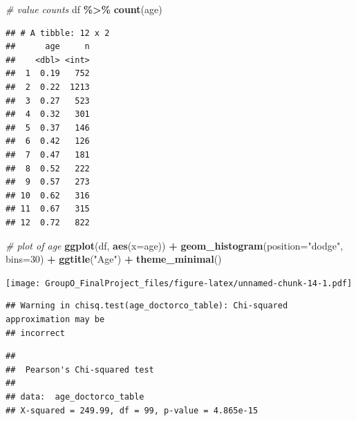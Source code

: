 \documentclass[
]{article}
\newenvironment{Shaded}{\begin{snugshade}}{\end{snugshade}}
\newcommand{\AttributeTok}[1]{\textcolor[rgb]{0.13,0.29,0.53}{#1}}
\newcommand{\CommentTok}[1]{\textcolor[rgb]{0.56,0.35,0.01}{\textit{#1}}}
\newcommand{\DecValTok}[1]{\textcolor[rgb]{0.00,0.00,0.81}{#1}}
\newcommand{\FunctionTok}[1]{\textcolor[rgb]{0.13,0.29,0.53}{\textbf{#1}}}
\newcommand{\NormalTok}[1]{#1}
\newcommand{\OtherTok}[1]{\textcolor[rgb]{0.56,0.35,0.01}{#1}}
\newcommand{\SpecialCharTok}[1]{\textcolor[rgb]{0.81,0.36,0.00}{\textbf{#1}}}
\newcommand{\StringTok}[1]{\textcolor[rgb]{0.31,0.60,0.02}{#1}}
\begin{document}
\begin{Shaded}
\begin{Highlighting}[]
\CommentTok{\# value counts}
\NormalTok{df }\SpecialCharTok{\%\textgreater{}\%} \FunctionTok{count}\NormalTok{(age)}
\end{Highlighting}
\end{Shaded}

\begin{verbatim}
## # A tibble: 12 x 2
##      age     n
##    <dbl> <int>
##  1  0.19   752
##  2  0.22  1213
##  3  0.27   523
##  4  0.32   301
##  5  0.37   146
##  6  0.42   126
##  7  0.47   181
##  8  0.52   222
##  9  0.57   273
## 10  0.62   316
## 11  0.67   315
## 12  0.72   822
\end{verbatim}

\begin{Shaded}
\begin{Highlighting}[]
\CommentTok{\# plot of age}
\FunctionTok{ggplot}\NormalTok{(df, }\FunctionTok{aes}\NormalTok{(}\AttributeTok{x=}\NormalTok{age)) }\SpecialCharTok{+}
  \FunctionTok{geom\_histogram}\NormalTok{(}\AttributeTok{position=}\StringTok{"dodge"}\NormalTok{, }\AttributeTok{bins=}\DecValTok{30}\NormalTok{) }\SpecialCharTok{+}
  \FunctionTok{ggtitle}\NormalTok{(}\StringTok{"Age"}\NormalTok{) }\SpecialCharTok{+}
  \FunctionTok{theme\_minimal}\NormalTok{()}
\end{Highlighting}
\end{Shaded}

\texttt{[image: GroupO\_FinalProject\_files/figure-latex/unnamed-chunk-14-1.pdf]}

\begin{Shaded}
\end{Shaded}

\begin{verbatim}
## Warning in chisq.test(age_doctorco_table): Chi-squared approximation may be
## incorrect
\end{verbatim}

\begin{verbatim}
## 
##  Pearson's Chi-squared test
## 
## data:  age_doctorco_table
## X-squared = 249.99, df = 99, p-value = 4.865e-15
\end{verbatim}
\end{document}
